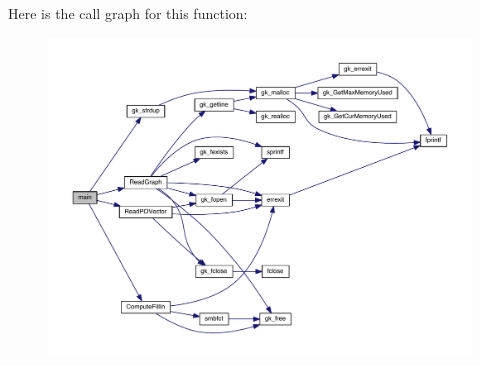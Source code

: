Here is the call graph for this function\+:\nopagebreak
\begin{figure}[H]
\begin{center}
\leavevmode
\includegraphics[width=350pt]{a00308_a0ddf1224851353fc92bfbff6f499fa97_cgraph}
\end{center}
\end{figure}
